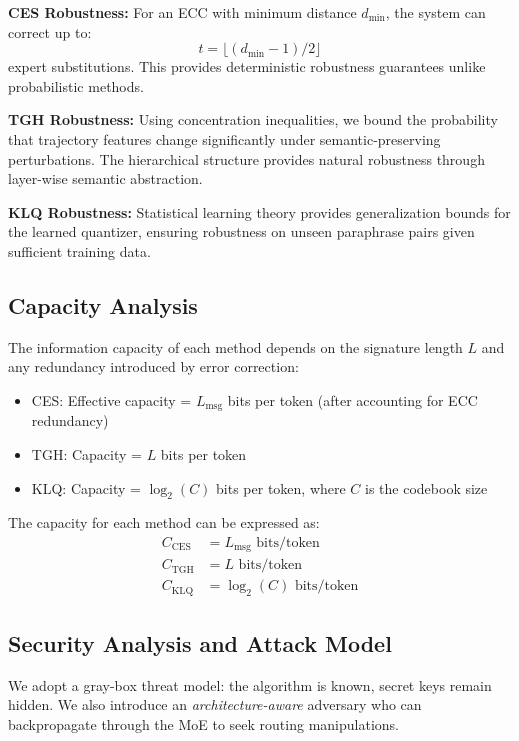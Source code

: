\textbf{CES Robustness:} For an ECC with minimum distance $d_{\min}$, the system can correct up to:
\begin{equation}
t = \lfloor(d_{\min}-1)/2\rfloor
\end{equation}
expert substitutions. This provides deterministic robustness guarantees unlike probabilistic methods.

\textbf{TGH Robustness:} Using concentration inequalities, we bound the probability that trajectory features change significantly under semantic-preserving perturbations. The hierarchical structure provides natural robustness through layer-wise semantic abstraction.

\textbf{KLQ Robustness:} Statistical learning theory provides generalization bounds for the learned quantizer, ensuring robustness on unseen paraphrase pairs given sufficient training data.

\subsection{Capacity Analysis}

The information capacity of each method depends on the signature length $L$ and any redundancy introduced by error correction:

\begin{itemize}
\item CES: Effective capacity = $L_{\text{msg}}$ bits per token (after accounting for ECC redundancy)
\item TGH: Capacity = $L$ bits per token  
\item KLQ: Capacity = $\log_2(C)$ bits per token, where $C$ is the codebook size
\end{itemize}

The capacity for each method can be expressed as:
\begin{align}
C_{\text{CES}} &= L_{\text{msg}} \text{ bits/token} \label{eq:ces_capacity} \\
C_{\text{TGH}} &= L \text{ bits/token} \label{eq:tgh_capacity} \\
C_{\text{KLQ}} &= \log_2(C) \text{ bits/token} \label{eq:klq_capacity}
\end{align}

\subsection{Security Analysis and Attack Model}

We adopt a gray-box threat model: the algorithm is known, secret keys remain hidden. We also introduce an \emph{architecture-aware} adversary who can backpropagate through the MoE to seek routing manipulations.

